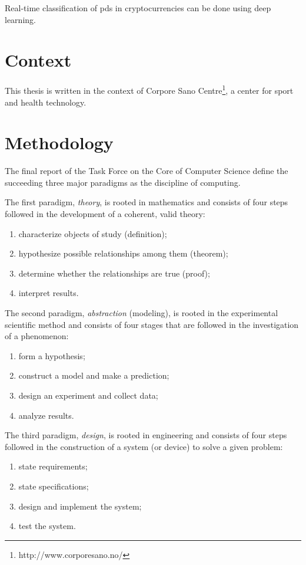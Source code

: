 \begin{displayquote}
    \begin{em}
    Real-time classification of \acfp{pd} in cryptocurrencies can be done using deep learning.
    \end{em}
\end{displayquote}

\section{Context}\label{sec:context}
This thesis is written in the context of Corpore Sano Centre\footnote{http://www.corporesano.no/}, a center for sport and health technology.

\section{Methodology}\label{sec:methodology}
The final report of the Task Force on the Core of Computer Science\cite{computing_as_a_discipline} define the succeeding three major paradigms as the discipline of computing.

The first paradigm, \emph{theory}, is rooted in mathematics and consists of four steps followed in the development of a coherent, valid theory: 
\begin{enumerate}
    \item characterize objects of study (definition);
    \item hypothesize possible relationships among them (theorem);
    \item determine whether the relationships are true (proof); 
    \item interpret results.
\end{enumerate}

The second paradigm, \emph{abstraction} (modeling), is rooted in the experimental scientific method and consists of four stages that are followed in the investigation of a phenomenon: 
\begin{enumerate}
    \item form a hypothesis;
    \item construct a model and make a prediction;
    \item design an experiment and collect data;
    \item analyze results.
\end{enumerate}

The third paradigm, \emph{design}, is rooted in engineering and consists of four steps followed in the construction of a system (or device) to solve a given problem:
\begin{enumerate}
    \item state requirements; 
    \item state specifications;
    \item design and implement the system;
    \item test the system.
\end{enumerate}



